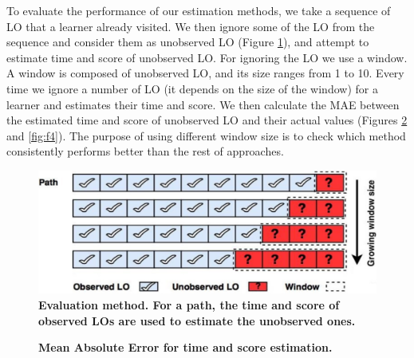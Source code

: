 \documentclass{sig-alternate}
\begin{document}
To evaluate the performance of our estimation methods, we take a sequence of LO that a learner already visited. We then ignore some of the LO from the sequence and consider them as unobserved LO (Figure \ref{fig:f2}), and attempt to estimate time and score of unobserved LO. For ignoring the LO we use a window. A window is composed of unobserved LO, and its size ranges from 1 to 10. Every time we ignore a number of LO (it depends on the size of the window) for a learner and estimates their time and score. We then calculate the MAE between the estimated time and score of unobserved LO and their actual values (Figures \ref{fig:f3} and \ref{fig:f4}). The purpose of using different window size is to check which method consistently performs better than the rest of approaches.

\begin{figure}[H]
    \centering
\includegraphics[width=0.8\linewidth]{images/figure2.png}
\caption{\textbf{Evaluation method. For a path, the time and score
of observed LOs are used to estimate the unobserved ones.}}
    \label{fig:f2}
\end{figure}

\begin{figure}[H]
\centering
{}\par        
{}
\caption{\textbf{Mean Absolute Error for time and score estimation.}}
\label{fig:f3}
\end{figure}
\end{document}

